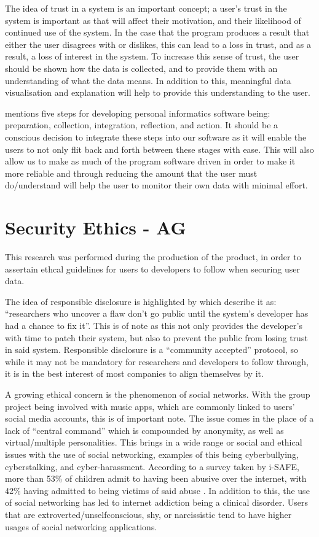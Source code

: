\documentclass[11pt]{report}
\begin{document}
The idea of trust in a system is an important concept; a user’s trust in the system is important as that will affect their motivation, and their likelihood of continued use of the system. In the case that the program produces a result that either the user disagrees with or dislikes, this can lead to a loss in trust, and as a result, a loss of interest in the system. To increase this sense of trust, the user should be shown how the data is collected, and to provide them with an understanding of what the data means. In addition to this, meaningful data visualisation and explanation will help to provide this understanding to the user. \cite{Jaimes2013}

\cite{Li2010} mentions five steps for developing personal informatics software being: preparation, collection, integration, reflection, and action.  It should be a conscious decision to integrate these steps into our software as it will enable the users to not only flit back and forth between these stages with ease. This will also allow us to make as much of the program software driven in order to make it more reliable and through reducing the amount that the user must do/understand will help the user to monitor their own data with minimal effort.

\section{Security Ethics - AG}

This research was performed during the production of the product, in order to assertain ethcal guidelines for users to developers to follow when securing user data.\newline

The idea of responsible disclosure is highlighted by \cite{2010a} which describe it as: “researchers who uncover a flaw don't go public until the system's developer has had a chance to fix it”.  This is of note as this not only provides the developer’s with time to patch their system, but also to prevent the public from losing trust in said system.  Responsible disclosure is a “community accepted” protocol, so while it may not be mandatory for researchers and developers to follow through, it is in the best interest of most companies to align themselves by it.

A growing ethical concern is the phenomenon of social networks.  With the group project being involved with music apps, which are commonly linked to users’ social media accounts, this is of important note.  The issue comes in the place of a lack of “central command” which is compounded by anonymity, as well as virtual/multiple personalities.  This brings in a wide range or social and ethical issues with the use of social networking, examples of this being cyberbullying, cyberstalking, and cyber-harassment.  According to a survey taken by i-SAFE, more than 53\% of children admit to having been abusive over the internet, with 42\% having admitted to being victims of said abuse \cite{iSAFE2004}. In addition to this, the use of social networking has led to internet addiction being a clinical disorder.  Users that are extroverted/unselfconscious, shy, or narcissistic \cite{Kizza2016} tend to have higher usages of social networking applications.  
\end{document}

